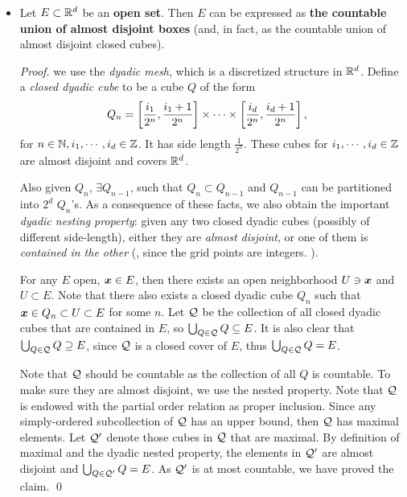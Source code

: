 \documentclass[11pt]{article}
\begin{document}
\begin{itemize}
\begin{proof}
It is seen that finite union of subcollections $\bigcup_{k=1}^{n}B_{k} \subset E$ for any $n\ge 1$, it follows by monotonicity that 
\begin{align*}
m^{*}(E) \ge  \sum_{k=1}^{n}\abs{B_{k}}.
\end{align*} 
Take both size for $n\rightarrow \infty$, we have the desired result. \qed.
\end{proof}

\item \begin{lemma} \label{lem: open_disjoint}
Let $E\subset {\mathbb R}^{d}$ be an \textbf{open set}. Then $E$ can be expressed as \textbf{the countable union of almost disjoint boxes} (and, in fact, as the countable union of almost disjoint closed cubes).
\end{lemma}
\begin{proof}
we use the \emph{dyadic mesh}, which is a discretized structure in ${\mathbb R}^{d}$. Define a \emph{closed dyadic cube} to be a cube $Q$ of the form
\begin{align*}
Q_{n} &= \left[\frac{i_{1}}{2^{n}}, \frac{i_{1}+1}{2^{n}}\right] \times \cdots\times \left[\frac{i_{d}}{2^{n}}, \frac{i_{d}+1}{2^{n}}\right],
\end{align*} for $n \in {\mathbb N}, i_{1}, \cdots, i_{d} \in {\mathbb Z}$. It has side length $\frac{1}{2^{n}}$. These cubes for $i_{1}, \cdots, i_{d} \in {\mathbb Z}$ are almost disjoint and covers ${\mathbb R}^{d}$.

Also given $Q_{n}$, $\exists Q_{n-1}$, such that $Q_{n} \subset Q_{n-1}$ and $Q_{n-1}$ can be partitioned into $2^{d}$ $Q_{n}$'s. As a consequence of these facts, we also obtain the important \emph{dyadic nesting property}: given any two closed dyadic cubes (possibly of different side-length), either they are \emph{almost disjoint}, or one of them is \emph{contained in the other} (, since the grid points are integers. ).

For any $E$ open, $\boldsymbol{x}\in E$, then there exists an open neighborhood $U \ni \boldsymbol{x}$ and $U\subset E$. Note that there also exists a closed dyadic cube $Q_{n}$ such that $\boldsymbol{x}\in Q_{n} \subset U\subset E$ for some $n$. Let ${\mathcal Q}$ be the collection of all closed dyadic cubes that are contained in $E$, so $\bigcup_{Q\in {\mathcal Q}}Q \subseteq E$. It is also clear  that $\bigcup_{Q\in {\mathcal Q}}Q \supseteq E$, since ${\mathcal Q}$ is a closed cover of $E$, thus $\bigcup_{Q\in {\mathcal Q}}Q  = E$.

Note that ${\mathcal Q}$ should be countable as the collection of all $Q$ is countable. To make sure they are almost disjoint, we use the nested property. Note that ${\mathcal Q}$ is endowed with the partial order relation as proper inclusion. Since any simply-ordered  subcollection of ${\mathcal Q}$ has an upper bound, then ${\mathcal Q}$ has maximal elements. Let ${\mathcal Q}'$ denote those cubes in ${\mathcal Q}$ that are maximal.  By definition of maximal and the dyadic nested property, the elements in ${\mathcal Q}'$ are almost disjoint and $\bigcup_{Q\in {\mathcal Q}'}Q  = E$. As ${\mathcal Q}'$ is at most countable, we have proved the claim. \qed
\end{proof}


\end{itemize}
\end{document}
